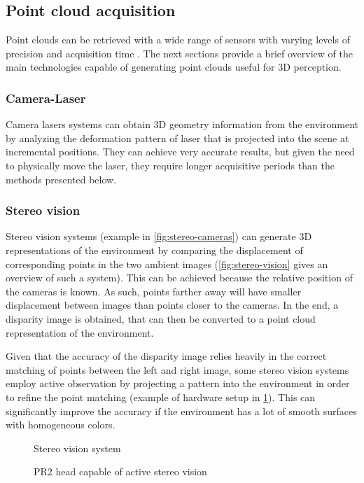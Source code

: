 \subsection{Point cloud acquisition}\label{sec:point-cloud-acquisition}

Point clouds can be retrieved with a wide range of sensors with varying levels of precision and acquisition time \cite{Sansoni2009}. The next sections provide a brief overview of the main technologies capable of generating point clouds useful for 3D perception.


\subsubsection{Camera-Laser}

Camera lasers systems can obtain 3D geometry information from the environment by analyzing the deformation pattern of laser that is projected into the scene at incremental positions. They can achieve very accurate results, but given the need to physically move the laser, they require longer acquisitive periods than the methods presented below.


\subsubsection{Stereo vision}

Stereo vision systems (example in \cref{fig:stereo-cameras}) can generate 3D representations of the environment by comparing the displacement of corresponding points in the two ambient images (\cref{fig:stereo-vision} gives an overview of such a system). This can be achieved because the relative position of the cameras is known. As such, points farther away will have smaller displacement between images than points closer to the cameras. In the end, a disparity image is obtained, that can then be converted to a point cloud representation of the environment.

Given that the accuracy of the disparity image relies heavily in the correct matching of points between the left and right image, some stereo vision systems employ active observation by projecting a pattern into the environment in order to refine the point matching (example of hardware setup in \cref{fig:pr2-active-stereo}). This can significantly improve the accuracy if the environment has a lot of smooth surfaces with homogeneous colors.

\begin{figure}[H]
	\begin{floatrow}[2]
		{\caption[Stereo vision system]{Stereo vision system \cite{Kaczurba2013}}\label{fig:stereo-cameras}}
		{\caption[PR2 head capable of active stereo vision]{PR2 head capable of active stereo vision\protect\footnotemark}\label{fig:pr2-active-stereo}}
	\end{floatrow}
\end{figure}


